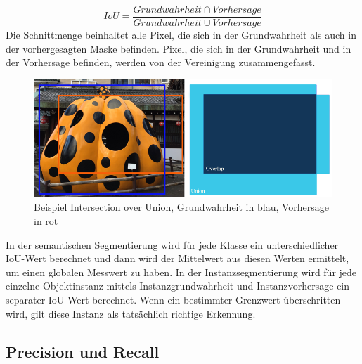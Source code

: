 \begin{equation}\label{equation:recall}
  IoU = \frac{Grundwahrheit\cap Vorhersage}{Grundwahrheit\cup Vorhersage}
\end{equation}
\noindent
Die Schnittmenge beinhaltet alle Pixel, die sich in der Grundwahrheit als auch in der vorhergesagten Maske befinden. Pixel, die sich in der Grundwahrheit und in der Vorhersage befinden, werden von der Vereinigung zusammengefasst. 
\\
\begin{figure}[ht]
  \centering
  \includegraphics[width=\textwidth]{pics/iou.PNG}
  \caption[IoU]{Beispiel Intersection over Union, Grundwahrheit in blau, Vorhersage in rot\cite{ref:map}}
  \label{fig:iou}
\end{figure}

\noindent
In der semantischen Segmentierung wird für jede Klasse ein unterschiedlicher IoU-Wert berechnet und dann wird der Mittelwert aus diesen Werten ermittelt, um einen globalen Messwert zu haben. In der Instanzsegmentierung wird für jede einzelne Objektinstanz mittels Instanzgrundwahrheit und Instanzvorhersage ein separater IoU-Wert berechnet. Wenn ein bestimmter Grenzwert überschritten wird, gilt diese Instanz als tatsächlich richtige Erkennung.\cite{ref:jordan}

\subsection{Precision und Recall}

